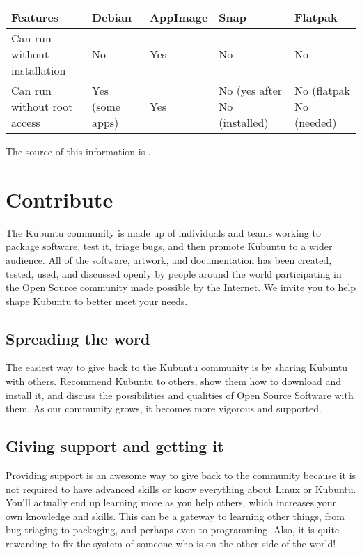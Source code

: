 \documentclass[letterpaper,10pt,english]{sphinxmanual}
\begin{document}
\begin{savenotes}\sphinxattablestart
\centering
\begin{tabulary}{\linewidth}[t]{|T|T|T|T|T|}
\hline
\sphinxstyletheadfamily 
Features
&\sphinxstyletheadfamily 
Debian
&\sphinxstyletheadfamily 
AppImage
&\sphinxstyletheadfamily 
Snap
&\sphinxstyletheadfamily 
Flatpak
\\
\hline
Can run without
installation
&
No
&
Yes
&
No
&
No
\\
\hline
Can run without
root access
&
Yes (some apps)
&
Yes
&
No (yes after
No (installed)
&
No (flatpak
No (needed)
\\
\hline
\end{tabulary}
\par
\sphinxattableend\end{savenotes}

The source of this information is .


\chapter{Contribute}
\label{\detokenize{docs/contribute:contribute}}\label{\detokenize{docs/contribute:contribute-link}}\label{\detokenize{docs/contribute::doc}}
The Kubuntu community is made up of individuals and teams working to package software, test it, triage bugs, and then promote Kubuntu to a wider audience. All of the software, artwork, and documentation has been created, tested, used, and discussed openly by people around the world participating in the Open Source community made possible by the Internet. We invite you to help shape Kubuntu to better meet your needs.


\section{Spreading the word}
\label{\detokenize{docs/contribute:spreading-the-word}}
The easiest way to give back to the Kubuntu community is by sharing Kubuntu with others. Recommend Kubuntu to others, show them how to download and install it, and discuss the possibilities and qualities of Open Source Software with them. As our community grows, it becomes more vigorous and supported.


\section{Giving support and getting it}
\label{\detokenize{docs/contribute:giving-support-and-getting-it}}
Providing support is an awesome way to give back to the community because it is not required to have advanced skills or know everything about Linux or Kubuntu. You’ll actually end up learning more as you help others, which increases your own knowledge and skills. This can be a gateway to learning other things, from bug triaging to packaging, and perhaps even to programming. Also, it is quite rewarding to fix the system of someone who is on the other side of the world!
\end{document}
